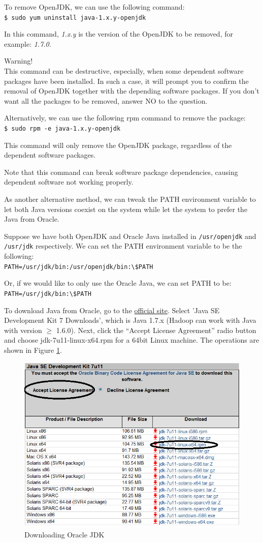 To remove OpenJDK, we can use the following command: \\
\verb|$ sudo yum uninstall java-1.x.y-openjdk|

In this command, \emph{1.x.y} is the version of the OpenJDK to be removed, for example: \emph{1.7.0}.

\begin{warning}
Warning! \\
This command can be destructive, especially, when some dependent software packages have been installed. In such a case, it will prompt you to confirm the removal of OpenJDK together with the depending software packages. If you don't want all the packages to be removed, answer NO to the question.
\end{warning}

Alternatively, we can use the following rpm command to remove the package:\\
\verb|$ sudo rpm -e java-1.x.y-openjdk|

This command will only remove the OpenJDK package, regardless of the dependent software packages.

Note that this command can break software package dependencies, causing dependent software not working properly.

As another alternative method, we can tweak the PATH environment variable to let both Java versions coexist on the system while let the system to prefer the Java from Oracle.

Suppose we have both OpenJDK and Oracle Java installed in \verb|/usr/openjdk| and \verb|/usr/jdk| respectively. We can set the PATH environment variable to be the following: \\
\verb|PATH=/usr/jdk/bin:/usr/openjdk/bin:\$PATH|

Or, if we would like to only use the Oracle Java, we can set PATH to be: \\
\verb|PATH=/usr/jdk/bin:\$PATH|

To download Java from Oracle, go to the \href{http://www.oracle.com/technetwork/java/javase/downloads/index.html}{official site}. Select 'Java SE Development Kit 7 Downloads', which is Java 1.7.x (Hadoop can work with Java with version $\ge$ 1.6.0). Next, click the ``Accept License Agreement'' radio button and choose jdk-7u11-linux-x64.rpm for a 64bit Linux machine. The operations are shown in Figure \ref{fig:oracle.jdk}.
\begin{figure}[h]
  \centering
  \includegraphics[width=.6\textwidth]{figs/5163os_02_04.png}
  \caption{Downloading Oracle JDK}\label{fig:oracle.jdk}
\end{figure} 
